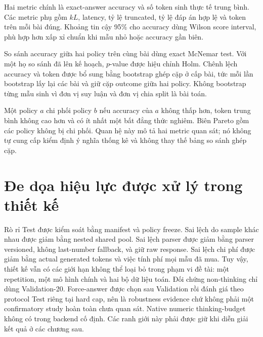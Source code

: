 Hai metric chính là exact-answer accuracy và số token sinh thực tế trung bình. Các
metric phụ gồm $kL$, latency, tỷ lệ truncated, tỷ lệ đáp án hợp lệ và token trên mỗi
bài đúng. Khoảng tin cậy 95\% cho accuracy dùng Wilson score interval, phù hợp hơn xấp
xỉ chuẩn khi mẫu nhỏ hoặc accuracy gần biên.

So sánh accuracy giữa hai policy trên cùng bài dùng exact McNemar test. Với một họ so
sánh đã lên kế hoạch, $p$-value được hiệu chỉnh Holm. Chênh lệch accuracy và token
được bổ sung bằng bootstrap ghép cặp ở cấp bài, tức mỗi lần bootstrap lấy lại các bài
và giữ cặp outcome giữa hai policy. Không bootstrap từng mẫu sinh vì đơn vị suy luận
và đơn vị chia split là bài toán.

Một policy $a$ chi phối policy $b$ nếu accuracy của $a$ không thấp hơn, token trung
bình không cao hơn và có ít nhất một bất đẳng thức nghiêm. Biên Pareto gồm các policy
không bị chi phối. Quan hệ này mô tả hai metric quan sát; nó không tự cung cấp kiểm
định ý nghĩa thống kê và không thay thế bảng so sánh ghép cặp.

\section{Đe dọa hiệu lực được xử lý trong thiết kế}

Rò rỉ Test được kiểm soát bằng manifest và policy freeze. Sai lệch do sample khác nhau
được giảm bằng nested shared pool. Sai lệch parser được giảm bằng parser versioned,
không last-number fallback, và giữ raw response. Sai lệch chi phí được giảm bằng actual
generated tokens và việc tính phí mọi mẫu đã mua. Tuy vậy, thiết kế vẫn có các giới
hạn không thể loại bỏ trong phạm vi đề tài: một repetition, một mô hình chính và hai
bộ dữ liệu toán. Đối chứng non-thinking chỉ dùng Validation-20. Force-answer được
chọn sau Validation rồi đánh giá theo protocol Test riêng tại hard cap, nên là
robustness evidence chứ không phải một confirmatory study hoàn toàn chưa quan sát.
Native numeric thinking-budget không có trong backend cố định. Các ranh giới này
phải được giữ khi diễn giải kết quả ở các chương sau.
